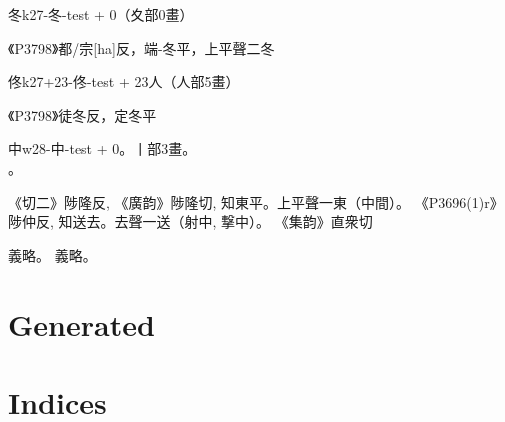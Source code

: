 \documentclass[a5paper,10pt,twoside]{article}
\begin{document}

\begin{Entry}{冬}{{k}}{27-冬-test}
  + 0（夊部0畫）
  \\
  \begin{Sound}
    《P3798》都/宗[ha]反，端-冬平，上平聲二冬
  \end{Sound}
\end{Entry}

\begin{Entry}{佟}{{k}}{27+23-佟-test}
  + 23人（人部5畫）
  \\
  \begin{Sound}
    《P3798》徒冬反，定冬平
  \end{Sound}
\end{Entry}


\begin{Entry}{中}{{w}}{28-中-test}%
  + 0。丨部3畫。
  \\
  。
  \begin{Sound}
    《切二》陟隆反, 《廣韵》陟隆切, 知東平。上平聲一東（中間）。
    《P3696(1)r》陟仲反, 知送去。去聲一送（射中, 撃中）。
    《集韵》直衆切
  \end{Sound}
  \begin{Sense}
    義略。
    義略。
  \end{Sense}
\end{Entry}

\cleardoublepage{}
\part{Generated}


\part{Indices}




\end{document}
